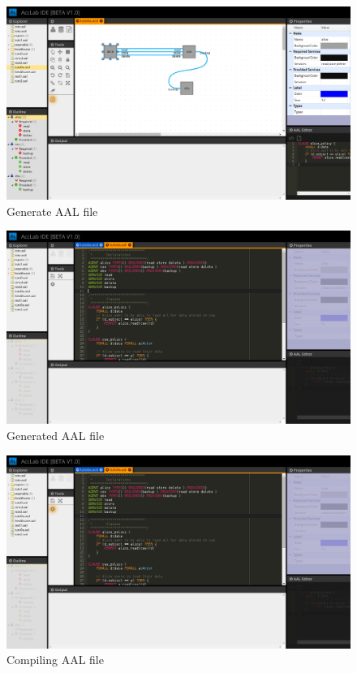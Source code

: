 \begin{figure}[!ht]
      \center
      \includegraphics[width=15cm,angle=0]{assets/gui/interface4.png}
      \caption{Generate AAL file}
\end{figure}

\begin{figure}[!ht]
      \center
      \includegraphics[width=15cm,angle=0]{assets/gui/interface5.png}
      \caption{Generated AAL file}
\end{figure}

\begin{figure}[!ht]
      \center
      \includegraphics[width=15cm,angle=0]{assets/gui/interface6.png}
      \caption{Compiling AAL file}
\end{figure}

